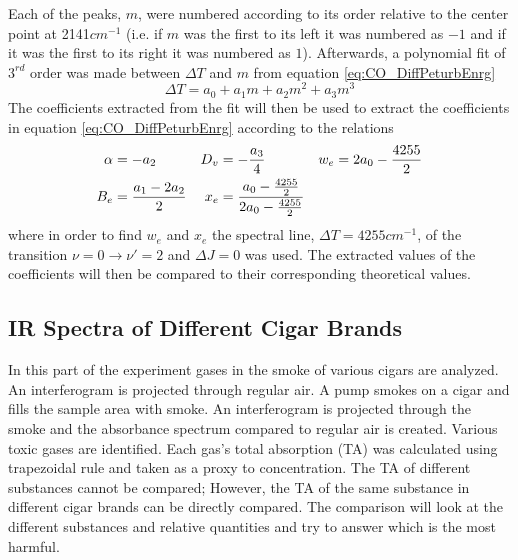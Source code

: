 \documentclass[reprint,amsmath,amssymb,aps, prl,superscriptaddress]{revtex4-2}
\begin{document}
Each of the peaks, $m$, were numbered according to its order relative to the center point at 2141$cm^{-1}$ (i.e. if $m$ was the first to its left
it was numbered as $-1$ and if it was the first to its right
it was numbered as $1$). Afterwards, a polynomial fit of $3^{rd}$ order was made between $\Delta T$ and $m$ from equation \ref{eq:CO_DiffPeturbEnrg}
\begin{equation} \label{eq:CO_EnrgStatesFit}
    \Delta T = a_{0}+a_{1}m+a_{2}m^2+a_{3}m^3
\end{equation}
The coefficients extracted from the fit will then be used to extract the coefficients in equation \ref{eq:CO_DiffPeturbEnrg}
according to the relations 
\begin{equation}
\begin{aligned}
\alpha &=-a_{2} & D_{v}&=-\frac{a_{3}}{4} & w_{e}&=2a_{0}-\frac{4255}{2} \\
B_{e}&=\frac{a_{1}-2a_{2}}{2} &  x_{e}&=\frac{a_{0}-\frac{4255}{2}}{2a_{0}-\frac{4255}{2}}
\end{aligned}
\label{eq:COFITcoefficients}
\centering
\end{equation}
where in order to find $w_{e}$ and $x_{e}$ the spectral line, $\Delta T=4255 cm^{-1}$, of the transition $\nu =0 \rightarrow \nu'=2$ and $\Delta J =0$ was used. The extracted values of the coefficients will then be compared to their corresponding theoretical values.

\subsection{IR Spectra of Different Cigar Brands}
In this part of the experiment gases in the smoke of various cigars are analyzed. An interferogram is projected through regular air. A pump smokes on a cigar and fills the sample area with smoke. An interferogram is projected through the smoke and the absorbance spectrum compared to regular air is created. Various toxic gases are identified. Each gas's total absorption (TA) was calculated using trapezoidal rule \cite{numerical} and taken as a proxy to concentration. The TA of different substances cannot be compared; However, the TA of the same substance in different cigar brands can be directly compared. The comparison will look at the different substances and relative quantities and try to answer which is the most harmful.
\end{document}
